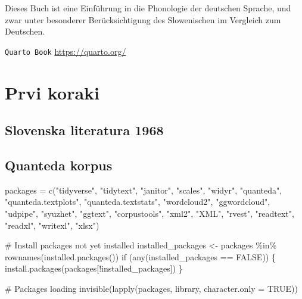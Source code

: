 \documentclass[
  letterpaper,
]{scrbook}
\newenvironment{Shaded}{\begin{snugshade}}{\end{snugshade}}
\newcommand{\AttributeTok}[1]{\textcolor[rgb]{0.40,0.45,0.13}{#1}}
\newcommand{\CommentTok}[1]{\textcolor[rgb]{0.37,0.37,0.37}{#1}}
\newcommand{\ConstantTok}[1]{\textcolor[rgb]{0.56,0.35,0.01}{#1}}
\newcommand{\ControlFlowTok}[1]{\textcolor[rgb]{0.00,0.23,0.31}{#1}}
\newcommand{\FunctionTok}[1]{\textcolor[rgb]{0.28,0.35,0.67}{#1}}
\newcommand{\NormalTok}[1]{\textcolor[rgb]{0.00,0.23,0.31}{#1}}
\newcommand{\OtherTok}[1]{\textcolor[rgb]{0.00,0.23,0.31}{#1}}
\newcommand{\SpecialCharTok}[1]{\textcolor[rgb]{0.37,0.37,0.37}{#1}}
\newcommand{\StringTok}[1]{\textcolor[rgb]{0.13,0.47,0.30}{#1}}
\begin{document}

Dieses Buch ist eine Einführung in die Phonologie der deutschen Sprache,
und zwar unter besonderer Berücksichtigung des Slowenischen im Vergleich
zum Deutschen.

\texttt{Quarto\ Book} \url{https://quarto.org/}

\part{Prvi koraki}

\hypertarget{sec-delavnica1}{%
\chapter{Slovenska literatura 1968}\label{sec-delavnica1}}

\hypertarget{sec-delavnica2}{%
\chapter{Quanteda korpus}\label{sec-delavnica2}}

\begin{Shaded}
\begin{Highlighting}[]
\NormalTok{packages }\OtherTok{=} \FunctionTok{c}\NormalTok{(}\StringTok{"tidyverse"}\NormalTok{, }\StringTok{"tidytext"}\NormalTok{, }\StringTok{"janitor"}\NormalTok{, }\StringTok{"scales"}\NormalTok{, }\StringTok{"widyr"}\NormalTok{, }
             \StringTok{"quanteda"}\NormalTok{, }\StringTok{"quanteda.textplots"}\NormalTok{, }\StringTok{"quanteda.textstats"}\NormalTok{,}
             \StringTok{"wordcloud2"}\NormalTok{, }\StringTok{"ggwordcloud"}\NormalTok{, }\StringTok{"udpipe"}\NormalTok{, }\StringTok{"syuzhet"}\NormalTok{,}
             \StringTok{"ggtext"}\NormalTok{, }\StringTok{"corpustools"}\NormalTok{, }\StringTok{"xml2"}\NormalTok{, }\StringTok{"XML"}\NormalTok{, }\StringTok{"rvest"}\NormalTok{, }
             \StringTok{"readtext"}\NormalTok{, }\StringTok{"readxl"}\NormalTok{, }\StringTok{"writexl"}\NormalTok{, }\StringTok{"xlsx"}\NormalTok{)}

\CommentTok{\# Install packages not yet installed}
\NormalTok{installed\_packages }\OtherTok{\textless{}{-}}\NormalTok{ packages }\SpecialCharTok{\%in\%} \FunctionTok{rownames}\NormalTok{(}\FunctionTok{installed.packages}\NormalTok{())}
\ControlFlowTok{if}\NormalTok{ (}\FunctionTok{any}\NormalTok{(installed\_packages }\SpecialCharTok{==} \ConstantTok{FALSE}\NormalTok{)) \{}
  \FunctionTok{install.packages}\NormalTok{(packages[}\SpecialCharTok{!}\NormalTok{installed\_packages])}
\NormalTok{\}}

\CommentTok{\# Packages loading}
\FunctionTok{invisible}\NormalTok{(}\FunctionTok{lapply}\NormalTok{(packages, library, }\AttributeTok{character.only =} \ConstantTok{TRUE}\NormalTok{))}
\end{Highlighting}
\end{Shaded}
\end{document}
